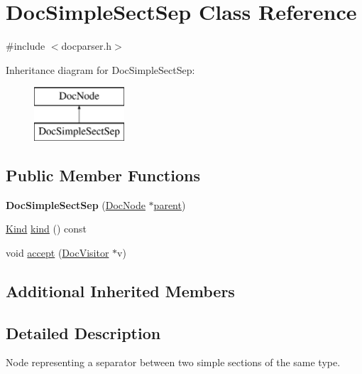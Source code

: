 \hypertarget{class_doc_simple_sect_sep}{}\section{Doc\+Simple\+Sect\+Sep Class Reference}
\label{class_doc_simple_sect_sep}


{\ttfamily \#include $<$docparser.\+h$>$}

Inheritance diagram for Doc\+Simple\+Sect\+Sep\+:\begin{figure}[H]
\begin{center}
\leavevmode
\includegraphics[height=2.000000cm]{class_doc_simple_sect_sep}
\end{center}
\end{figure}
\subsection*{Public Member Functions}
\begin{DoxyCompactItemize}
\item 
\mbox{\label{class_doc_simple_sect_sep_ad7092c694033d0cb611ca80ff4dce6f5}} 
{\bfseries Doc\+Simple\+Sect\+Sep} (\mbox{\hyperlink{class_doc_node}{Doc\+Node}} $\ast$\mbox{\hyperlink{class_doc_node_a73e8ad29a91cfceb0968eb00db71a23d}{parent}})
\item 
\mbox{\hyperlink{class_doc_node_aebd16e89ca590d84cbd40543ea5faadb}{Kind}} \mbox{\hyperlink{class_doc_simple_sect_sep_a6416749c870b555e75c420e5b7a9de77}{kind}} () const
\item 
void \mbox{\hyperlink{class_doc_simple_sect_sep_a75f9ed4d18c1fa4c83de3d9ef276bc7e}{accept}} (\mbox{\hyperlink{class_doc_visitor}{Doc\+Visitor}} $\ast$v)
\end{DoxyCompactItemize}
\subsection*{Additional Inherited Members}


\subsection{Detailed Description}
Node representing a separator between two simple sections of the same type. 

